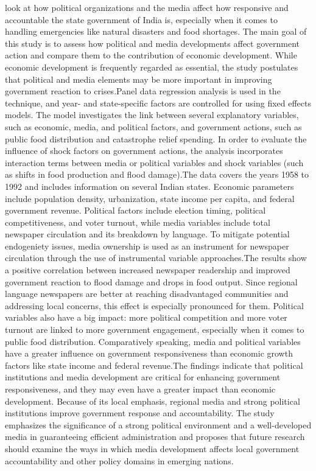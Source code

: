 look at how political organizations and the media affect how responsive and accountable the state government of India is, especially when it comes to handling emergencies like natural disasters and food shortages. The main goal of this study is to assess how political and media developments affect government action and compare them to the contribution of economic development. While economic development is frequently regarded as essential, the study postulates that political and media elements may be more important in improving government reaction to crises.Panel data regression analysis is used in the technique, and year- and state-specific factors are controlled for using fixed effects models. The model investigates the link between several explanatory variables, such as economic, media, and political factors, and government actions, such as public food distribution and catastrophe relief spending. In order to evaluate the influence of shock factors on government actions, the analysis incorporates interaction terms between media or political variables and shock variables (such as shifts in food production and flood damage).The data covers the years 1958 to 1992 and includes information on several Indian states. Economic parameters include population density, urbanization, state income per capita, and federal government revenue. Political factors include election timing, political competitiveness, and voter turnout, while media variables include total newspaper circulation and its breakdown by language. To mitigate potential endogeniety issues, media ownership is used as an instrument for newspaper circulation through the use of instrumental variable approaches.The results show a positive correlation between increased newspaper readership and improved government reaction to flood damage and drops in food output. Since regional language newspapers are better at reaching disadvantaged communities and addressing local concerns, this effect is especially pronounced for them. Political variables also have a big impact: more political competition and more voter turnout are linked to more government engagement, especially when it comes to public food distribution. Comparatively speaking, media and political variables have a greater influence on government responsiveness than economic growth factors like state income and federal revenue.The findings indicate that political institutions and media development are critical for enhancing government responsiveness, and they may even have a greater impact than economic development. Because of its local emphasis, regional media and strong political institutions improve government response and accountability. The study emphasizes the significance of a strong political environment and a well-developed media in guaranteeing efficient administration and proposes that future research should examine the ways in which media development affects local government accountability and other policy domains in emerging nations.\\

